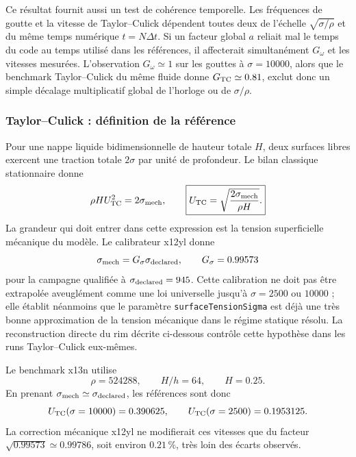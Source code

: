 \documentclass[11pt,a4paper]{article}
\begin{document}
Ce résultat fournit aussi un test de cohérence temporelle. Les fréquences de goutte et la vitesse de Taylor--Culick dépendent toutes deux de l'échelle $\sqrt{\sigma/\rho}$ et du même temps numérique $t=N\Delta t$. Si un facteur global $a$ reliait mal le temps du code au temps utilisé dans les références, il affecterait simultanément $G_\omega$ et les vitesses mesurées. L'observation $G_\omega\simeq1$ sur les gouttes à $\sigma=10000$, alors que le benchmark Taylor--Culick du même fluide donne $G_{\rm TC}\simeq0.81$, exclut donc un simple décalage multiplicatif global de l'horloge ou de $\sigma/\rho$.

\subsubsection{Taylor--Culick : définition de la référence}

Pour une nappe liquide bidimensionnelle de hauteur totale $H$, deux surfaces libres exercent une traction totale $2\sigma$ par unité de profondeur. Le bilan classique stationnaire donne
\begin{equation}
  \rho H U_{\rm TC}^2=2\sigma_{\rm mech},
  \qquad
  \boxed{
  U_{\rm TC}=\sqrt{\frac{2\sigma_{\rm mech}}{\rho H}}.
  }
  \label{eq:x13n_tc_velocity}
\end{equation}
La grandeur qui doit entrer dans cette expression est la tension superficielle mécanique du modèle. Le calibrateur x12yl donne
\begin{equation}
  \sigma_{\rm mech}
  =G_\sigma\sigma_{\rm declared},
  \qquad
  G_\sigma=0.99573
\end{equation}
pour la campagne qualifiée à $\sigma_{\rm declared}=945$. Cette calibration ne doit pas être extrapolée aveuglément comme une loi universelle jusqu'à $\sigma=2500$ ou $10000$ ; elle établit néanmoins que le paramètre \texttt{surfaceTensionSigma} est déjà une très bonne approximation de la tension mécanique dans le régime statique résolu. La reconstruction directe du rim décrite ci-dessous contrôle cette hypothèse dans les runs Taylor--Culick eux-mêmes.

Le benchmark x13n utilise
\begin{equation}
  \rho=524288,\qquad H/h=64,\qquad H=0.25.
\end{equation}
En prenant $\sigma_{\rm mech}\simeq\sigma_{\rm declared}$, les références sont donc
\begin{equation}
  U_{\rm TC}(\sigma=10000)=0.390625,
  \qquad
  U_{\rm TC}(\sigma=2500)=0.1953125.
\end{equation}
La correction mécanique x12yl ne modifierait ces vitesses que du facteur $\sqrt{0.99573}\simeq0.99786$, soit environ $0.21\,\%$, très loin des écarts observés.
\end{document}
